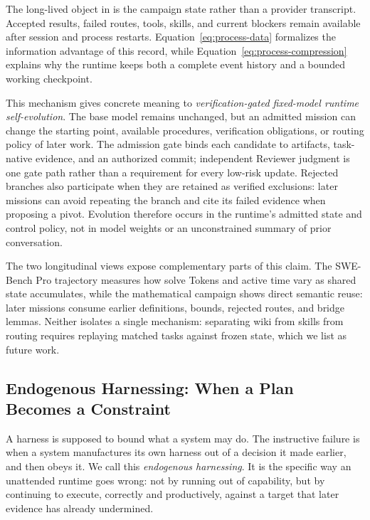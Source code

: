 The long-lived object in \systemname is the campaign state rather than a provider
transcript. Accepted results, failed routes, tools, skills, and current blockers
remain available after session and process restarts. Equation~\ref{eq:process-data}
formalizes the information advantage of this record, while
Equation~\ref{eq:process-compression} explains why the runtime keeps both a complete
event history and a bounded working checkpoint.

This mechanism gives concrete meaning to \emph{verification-gated fixed-model runtime
self-evolution}. The base model remains unchanged, but an admitted mission can
change the starting point, available procedures, verification obligations, or
routing policy of later work. The admission gate binds each candidate to artifacts,
task-native evidence, and an authorized commit; independent Reviewer judgment is one
gate path rather than a requirement for every low-risk update. Rejected branches
also participate when they are retained as verified exclusions: later missions can
avoid repeating the branch and cite its failed evidence when proposing a pivot.
Evolution therefore occurs in the runtime's admitted state and control policy, not
in model weights or an unconstrained summary of prior conversation.

The two longitudinal views expose complementary parts of this claim. The SWE-Bench
Pro trajectory measures how solve Tokens and active time vary as shared state
accumulates, while the mathematical campaign shows direct semantic reuse: later
missions consume earlier definitions, bounds, rejected routes, and bridge lemmas.
Neither isolates a single mechanism: separating wiki from skills from routing
requires replaying matched tasks against frozen state, which we list as future work.

\subsection{Endogenous Harnessing: When a Plan Becomes a Constraint}
\label{sec:endogenous-harness}

A harness is supposed to bound what a system may do. The instructive failure is when
a system manufactures its own harness out of a decision it made earlier, and then
obeys it. We call this \emph{endogenous harnessing}. It is the specific way an
unattended runtime goes wrong: not by running out of capability, but by continuing to
execute, correctly and productively, against a target that later evidence has already
undermined.

